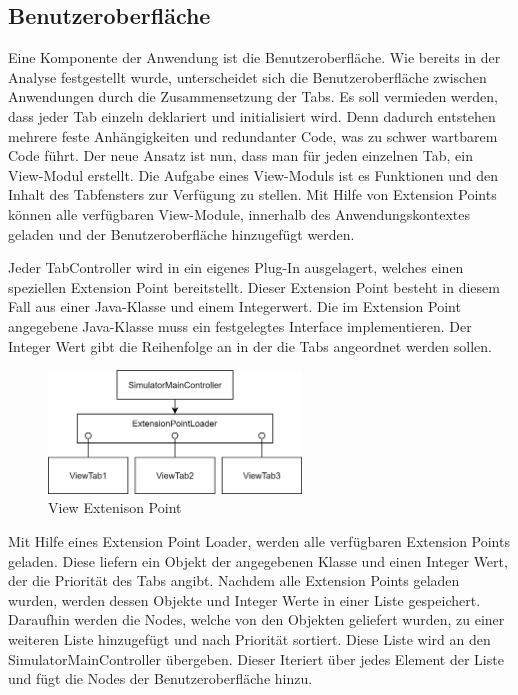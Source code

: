 \subsection{Benutzeroberfläche}

Eine Komponente der Anwendung ist die Benutzeroberfläche. Wie bereits in der Analyse festgestellt wurde, unterscheidet sich die Benutzeroberfläche zwischen Anwendungen durch die Zusammensetzung der Tabs. Es soll vermieden werden, dass jeder Tab einzeln deklariert und initialisiert wird. Denn dadurch entstehen mehrere feste Anhängigkeiten und redundanter Code, was zu schwer wartbarem Code führt. Der neue Ansatz ist nun, dass man für jeden einzelnen Tab, ein View-Modul erstellt. Die Aufgabe eines View-Moduls ist es Funktionen und den Inhalt des Tabfensters zur Verfügung zu stellen. Mit Hilfe von Extension Points können alle verfügbaren View-Module, innerhalb des Anwendungskontextes geladen und der Benutzeroberfläche hinzugefügt werden.



Jeder TabController wird in ein eigenes Plug-In ausgelagert, welches einen speziellen Extension Point bereitstellt. Dieser Extension Point besteht in diesem Fall aus einer Java-Klasse und einem Integerwert. Die im Extension Point angegebene Java-Klasse muss ein festgelegtes Interface implementieren. Der Integer Wert gibt die Reihenfolge an in der die Tabs angeordnet werden sollen.


\begin{figure}[h]
    \centering
    \includegraphics[width=0.6\textwidth]{content/assets/Kapitel4/ExtensionPointEasy.png}
    \caption{View Extenison Point}
\end{figure}

Mit Hilfe eines Extension Point Loader, werden alle verfügbaren Extension Points geladen. Diese liefern ein Objekt der angegebenen Klasse und einen Integer Wert, der die Priorität des Tabs angibt. Nachdem alle Extension Points geladen wurden, werden dessen Objekte und Integer Werte in einer Liste gespeichert. Daraufhin werden die Nodes, welche von den Objekten geliefert wurden, zu einer weiteren Liste hinzugefügt und nach Priorität sortiert. Diese Liste wird an den SimulatorMainController übergeben. Dieser Iteriert über jedes Element der Liste und fügt die Nodes der Benutzeroberfläche hinzu. 


